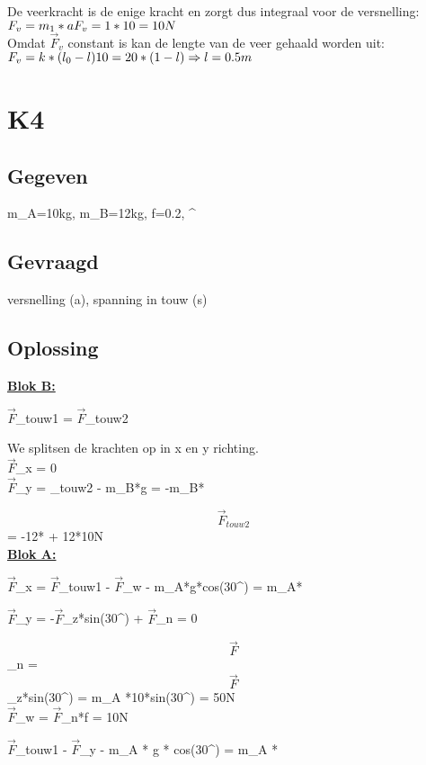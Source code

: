 \documentclass[10pt,a4paper]{article}
\begin{document}
\noindent De veerkracht is de enige kracht en zorgt dus integraal voor de versnelling:\\
$F_v = m_1*a\\
F_v = 1*10 = 10 N$\\

\noindent Omdat $\vec{F}_v$ constant is kan de lengte van de veer gehaald worden uit:\\
$F_v = k * (l_0 - l)\\
10 = 20 *(1 -l)\\
\Rightarrow l =0.5m$

\section{K4}
\subsection{Gegeven}
m_{A}=10kg, m_{B}=12kg, f=0.2, ^{\circ} 
\subsection{Gevraagd}
versnelling (a), spanning in touw (s)
\subsection{Oplossing}
\underline{\textbf{Blok B:}}

$\vec{F}$_{touw1} = $\vec{F}$_{touw2}


We splitsen de krachten op in x en y richting.\\

$\vec{F}$_{x} = 0\\

$\vec{F}$_{y} = _{touw2} - m_{B}*g = -m_{B}*

\Rightarrow $$\vec{F}_{touw2}$$ = -12* + 12*10N\\

\underline{\textbf{Blok A:}}

$\vec{F}$_{x} = $\vec{F}$_{touw1} - $\vec{F}$_{w} - m_{A}*g*cos(30^{\circ}) = m_{A}*

$\vec{F}$_{y} = -$\vec{F}$_{z}*sin(30^{\circ}) + $\vec{F}$_{n} = 0

\Rightarrow $$\vec{F}$$_{n} = $$\vec{F}$$_{z}*sin(30^{\circ}) = m_{A} *10*sin(30^{\circ}) = 50N\\


$\vec{F}$_{w} = $\vec{F}$_{n}*f = 10N

$\vec{F}$_{touw1} - $\vec{F}$_{y} - m_{A} * g * cos(30^{\circ}) = m_{A} * 
\end{document}
